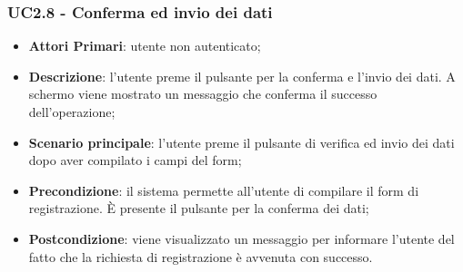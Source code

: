 \subsubsection{UC2.8 - Conferma ed invio dei dati}
\begin{itemize}
	\item \textbf{Attori Primari}: utente non autenticato;
	\item \textbf{Descrizione}:
	l'utente preme il pulsante per la conferma e l'invio dei dati. A schermo viene mostrato un messaggio che conferma il successo dell'operazione;
	\item \textbf{Scenario principale}: l'utente preme il pulsante di verifica ed invio dei dati dopo aver compilato i campi del form;
	\item \textbf{Precondizione}: il sistema permette all'utente di compilare il form di registrazione. \`E presente il pulsante per la conferma dei dati;
	\item \textbf{Postcondizione}: viene visualizzato un messaggio per informare l'utente del fatto che la richiesta di registrazione è avvenuta con successo.
\end{itemize}

